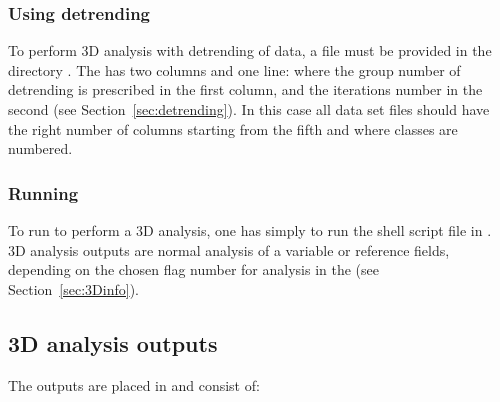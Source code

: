 \subsubsection{Using detrending}


To perform \diva 3D analysis with detrending of data, a  file must be provided in the directory . The   has two columns and one line: where the group number of detrending is prescribed in the first column, and the iterations number in the second (see Section~\ref{sec:detrending}). In this case all data set files should have the right number of columns starting from the fifth and where classes are numbered.


\begin{center}
\end{center}



\subsubsection{Running }

To run \diva to perform a 3D analysis, one has simply to run the shell script file  in . \diva 3D analysis outputs are normal analysis of a variable or reference fields, depending on the chosen flag number for analysis in the  (see Section~\ref{sec:3Dinfo}).


\subsection{\diva 3D analysis outputs}

The outputs are placed in  and consist of:

